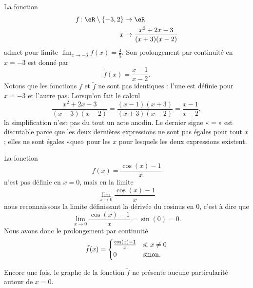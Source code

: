 \begin{example}
    La fonction
    \begin{equation}
        \begin{aligned}
            f\colon \eR\setminus\{ -3,2 \}&\to \eR \\
            x&\mapsto  \frac{ x^2+2x-3 }{ (x+3)(x-2) }
        \end{aligned}
    \end{equation}
    admet pour limite \( \lim_{x\to -3} f(x)=\frac{ 4 }{ 5 }\). Son prolongement par continuité en \( x=-3\) est donné par
    \begin{equation}
        \tilde f(x)=\frac{ x-1 }{ x-2 }.
    \end{equation}
    Notons que les fonctions \( f\) et \( \tilde f\) ne sont pas identiques : l'une est définie pour \( x=-3\) et l'autre pas. Lorsqu'on fait le calcul
    \begin{equation}
        \frac{ x^2+2x-3 }{ (x+3)(x-2) }=\frac{ (x-1)(x+3) }{ (x+3)(x-2) }=\frac{ x-1 }{ x-2 },
    \end{equation}
    la simplification n'est pas du tout un acte anodin. Le dernier signe «\( =\)» est discutable parce que les deux dernières expressions ne sont pas égales pour tout \( x\); elles ne sont égales «que» pour les \( x\) pour lesquels les deux expressions existent.
\end{example}

\begin{example} \label{ExQWHooGddTLE}
    La fonction 
    \begin{equation}
        f(x)=\frac{ \cos(x)-1 }{ x }
    \end{equation}
    n'est pas définie en \( x=0\), mais en la limite
    \begin{equation}
        \lim_{x\to 0} \frac{ \cos(x)-1 }{ x }
    \end{equation}
    nous reconnaissons la limite définissant la dérivée du cosinus en \( 0\), c'est à dire que
    \begin{equation}
        \lim_{x\to 0} \frac{ \cos(x)-1 }{ x }=\sin(0)=0.
    \end{equation}
    Nous avons donc le prolongement par continuité
    \begin{equation}
        \tilde f(x)=\begin{cases}
            \frac{ \cos(x)-1 }{ x }    &   \text{si \( x\neq 0\)}\\
            0    &    \text{sinon}.
        \end{cases}
    \end{equation}

    Encore une fois, le graphe de la fonction \(\tilde f\) ne présente aucune particularité autour de \( x=0\).
    \begin{center}
        
    \end{center}

\end{example}



